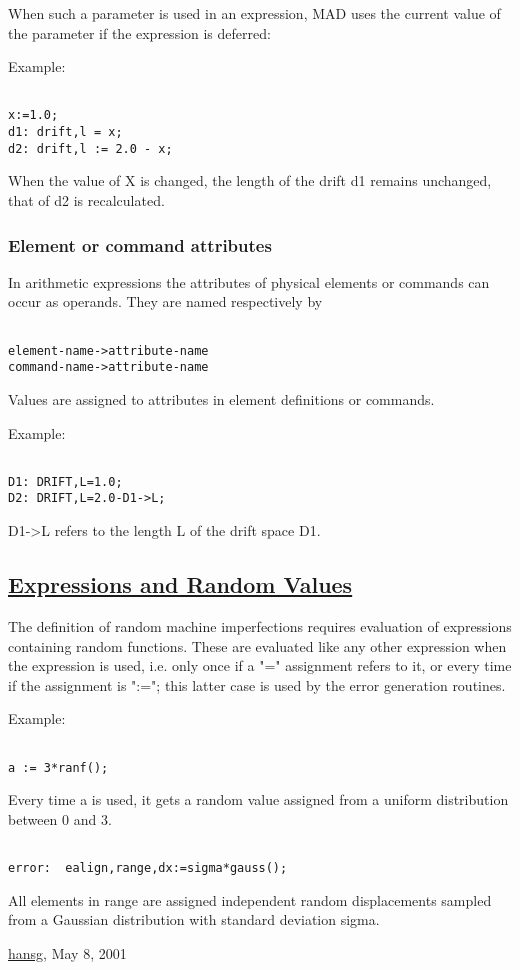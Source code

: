  When such a parameter is used in an expression, MAD uses the current value of the parameter if the expression is deferred: 

 Example: 
\begin{verbatim}

x:=1.0;
d1: drift,l = x;
d2: drift,l := 2.0 - x;
\end{verbatim} When the value of X is changed, the length of the drift d1 remains unchanged, that of d2 is recalculated.  

\subsubsection{Element or command attributes} In arithmetic expressions the attributes of physical elements or commands can occur as operands. They are named respectively by 
\begin{verbatim}

element-name->attribute-name
command-name->attribute-name
\end{verbatim} Values are assigned to attributes in element definitions or commands. 

 Example: 
\begin{verbatim}

D1: DRIFT,L=1.0;
D2: DRIFT,L=2.0-D1->L;
\end{verbatim} D1-\textgreater L refers to the length L of the drift space D1.  

\subsection{\href{defer}{Expressions and Random Values}} The definition of random machine imperfections requires evaluation of expressions containing random functions. These are evaluated like any other expression when the expression is used, i.e. only once if a "=" assignment refers to it, or every time if the assignment is ":="; this latter case is used by the error generation routines. 

 Example: 
\begin{verbatim}

a := 3*ranf();
\end{verbatim} Every time a is used, it gets a random value assigned from a uniform distribution between 0 and 3. 
\begin{verbatim}

error:  ealign,range,dx:=sigma*gauss();
\end{verbatim} All elements in range are assigned independent random displacements sampled from a Gaussian distribution with standard deviation sigma. 

\href{http://www.cern.ch/Hans.Grote/hansg_sign.html}{hansg}, May 8, 2001 

